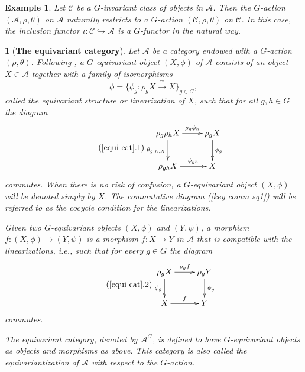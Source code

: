 \documentclass[12pt,twoside]{amsart}
\theoremstyle{bfupright head,slanted body}
\theoremstyle{bfupright head,upright body}
\newtheorem{bfhpg}[res]{}               \newtheorem*{bfhpg*}{}
\theoremstyle{fixed bf head,slanted body}
\theoremstyle{fixed bf head,upright body}
\newtheorem{exa}[res]{Example}           \newtheorem*{exa*}{Example}
\theoremstyle{numbered paragraph}
\numberwithin{equation}{res}
\newcommand{\calC}{\mathcal{C}}
\newcommand{\calA}{\mathcal{A}}
\begin{document}
\begin{exa} \label{inclusion G-functor}
Let $\calC$ be a $G$-invariant class of objects in $\calA$.
Then the $G$-action $(\calA, \rho, \theta)$ on $\calA$ naturally restricts to a $G$-action $(\calC, \rho, \theta)$ on $\calC$.
In this case, the inclusion functor $\iota:\calC\hookrightarrow\calA$ is a $G$-functor in the natural way.
\end{exa}

\begin{bfhpg}[\bf The equivariant category]\label{equi cat}
Let \(\calA\) be a category endowed with a \(G\)-action \((\rho,\theta)\).
Following \cite{2025Equ}, a \(G\)-{\it equivariant object} \((X,\phi)\) of \(\calA\) consists of an object \(X\in\calA\) together with a family of isomorphisms
\[
\phi=\{\phi_g:\rho_g X \overset{\cong}{\longrightarrow} X\}_{g\in G},
\]
called the {\it equivariant structure} or {\it linearization} of \(X\), such that for all \(g,h\in G\) the diagram
\begin{equation*} \label{key comm sq1} \tag{\ref{equi cat}.1}
\begin{gathered}
\xymatrix{
   \rho_g \rho_h X
\ar[d]_-{\theta_{g,h,X}}
\ar[r]^-{\rho_g \phi_h}
&  \rho_g X
\ar[d]^-{\phi_g}                                           \\
   \rho_{gh}X
\ar[r]^-{\phi_{gh}}
&  X                                                                          }
\end{gathered}
\end{equation*}
commutes.
When there is no risk of confusion, a \(G\)-equivariant object \((X,\phi)\) will be denoted simply by \(X\).
The commutative diagram (\ref{key comm sq1}) will be referred to as the \emph{cocycle condition} for the linearizations.

Given two \(G\)-equivariant objects \((X,\phi)\) and \((Y,\psi)\), a morphism \(f:(X,\phi)\to(Y,\psi)\) is a morphism \(f:X\to Y\) in \(\calA\) that is compatible with the linearizations, i.e., such that for every \(g\in G\) the diagram
\begin{equation*} \label{key comm sq2} \tag{\ref{equi cat}.2}
\begin{gathered}
\xymatrix{
   \rho_g X
\ar[d]_-{\phi_g}
\ar[r]^-{\rho_g f}
&  \rho_g Y
\ar[d]^-{\psi_g}                      \\
   X
\ar[r]^-{f}
&  Y                                              }
\end{gathered}
\end{equation*}
commutes.

The {\it equivariant category}, denoted by \(\calA^G\), is defined to have \(G\)-equivariant objects as objects and morphisms as above. This category is also called the \emph{equivariantization} of \(\calA\) with respect to the \(G\)-action.
\end{bfhpg}
\end{document}
